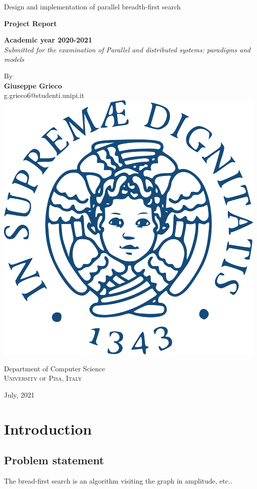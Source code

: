 \documentclass{article}
\begin{document}
\vspace*{\fill}
\begin{center}
    {\Huge{Design and implementation of parallel breadth-first search} }\\[2mm]
    \vspace{6.5mm}
    
    {\large \textbf{Project Report}}\\[5pt]
    \vspace{15mm}

    {\large \textbf{Academic year 2020-2021}}\\
    {\large \textit{Submitted for the examination of Parallel and distributed systems: paradigms and models}}\\[5pt]
    \vspace{6.5mm}

    {\large By}\\
    \vspace{3mm}
    {\large\textbf{Giuseppe Grieco}}\\
    {\large g.grieco6@studenti.unipi.it}\\

    \vspace{11mm}
    \includegraphics[scale=0.07]{./images/logo.png}\\
    \vspace{11mm}

    {\large Department of Computer Science\\
    \textsc{University of Pisa, Italy}}\\
    \vspace{15mm}

    {\large{July, 2021}}
\end{center}
\vspace*{\fill}
\newpage

\tableofcontents
\newpage


\section{Introduction}
\subsection{Problem statement}
The bread-first search is an algorithm visiting the graph in amplitude, etc..
\end{document}
